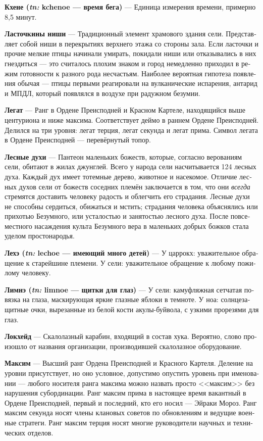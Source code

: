 \documentclass[a4paper,12pt,fleqn]{book}\usepackage{cooltooltips}\usepackage{polyglossia}\setdefaultlanguage[babelshorthands=true]{russian}\setotherlanguage{english}\defaultfontfeatures{Ligatures=TeX,Mapping=tex-text} \usepackage{xcolor}\definecolor{lightgray}{HTML}{bbbbbb}\color{lightgray}\newcommand{\ml}[3]{\textenglish{\textcolor{black}{#3}}}
\newcommand{\theterm}[3]{\textbf{\hypertarget{#1}{#2}} --- #3}
\newcommand{\theorigin}[3]{\textit{#1:} #2 --- #3}
\begin{document}
{\theterm{kchenoe-time}
{Кхене (\theorigin{tn}{kchenoe}{время бега})}
{Единица измерения времени, примерно 8,5 минут.}

\theterm{swallow-niche} %
{Ласточкины ниши}
{Традиционный элемент храмового здания сели.
Представляет собой ниши в перекрытиях верхнего этажа со стороны зала.
Если ласточки и прочие мелкие птицы начинали умирать, покидали ниши или отказывались в них гнездиться --- это считалось плохим знаком и город немедленно приходил в режим готовности к разного рода несчастьям.
Наиболее вероятная гипотеза появления обычая --- птицы первыми реагировали на вулканические испарения, антарид и МПДЛ, который появлялся в воздухе при радужном безумии.}

\theterm{legate} %
{Легат}
{Ранг в Ордене Преисподней и Красном Картеле, находящийся выше центуриона и ниже максима.
Соответствует деймо в раннем Ордене Преисподней.
Делился на три уровня: легат терция, легат секунда и легат прима.
Символ легата в Ордене Преисподней --- перевёрнутый топор.}

\theterm{silva-spirits}
{Лесные духи}
{Пантеон маленьких божеств, которые, согласно верованиям сели, обитают в жилах джунглей.
Всего у народа сели насчитывается 124 лесных духа.
Каждый дух имеет тотемные дерево, животное и насекомое.
Отличие лесных духов сели от божеств соседних племён заключается в том, что они \emph{всегда} стремятся доставить человеку радость и облегчить его страдания.
Лесные духи не способны сердиться, обижаться и мстить;
страдания человека объяснялись или прихотью Безумного, или усталостью и занятостью лесного духа.
После повсеместного насаждения культа Безумного вера в маленьких добрых божков стала уделом простонародья.}

\theterm{lechoe}
{Лехэ (\theorigin{tn}{lechoe}{имеющий много детей})}
{У царрокх: уважительное обращение к старейшине племени.
У сели: уважительное обращение к любому пожилому человеку.}

\theterm{limnoe}
{Лимнэ (\theorigin{tn}{limnoe}{щитки для глаз})}
{У сели: камуфляжная сетчатая повязка на глаза, маскирующая яркие глазные яблоки в темноте.
У ноа: солнцезащитные очки, вырезанные из белой кости акулы-буйвола, с узкими прорезями для глаз.}

\theterm{lockheed}
{Локхейд}
{Скалолазный карабин, входящий в состав хука.
Вероятно, слово произошло от названия организации, производившей скалолазное оборудование.}

\theterm{maccsim} %
{Максим}
{Высший ранг Ордена Преисподней и Красного Картеля.
Деление на уровни присутствует, но оно условное, допустимо опустить уровень при именовании --- любого носителя ранга максима можно назвать просто <<максим>> без нарушения субординации.
Ранг максим прима в настоящее время вакантный в Ордене Преисподней, первый и последний, кто его носил --- Эйраки Мороз.
Ранг максим секунда носят члены клановых советов по обновлениям и ведущие военные стратеги.
Ранг максим терция носят многие руководители научных и технических отделов.}

}
\end{document}
